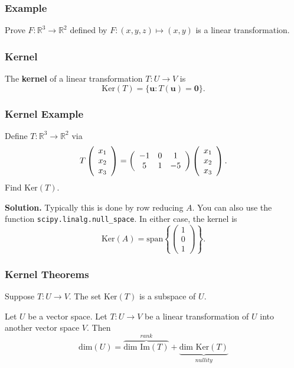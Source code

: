 \documentclass{beamer}
\begin{document}
\begin{frame}[t]
\frametitle{Example}
\begin{Example}
Prove $F: \mathbb{R}^3\to\mathbb{R}^2$ defined by $F:(x, y, z)\mapsto (x, y)$ is a linear transformation.
\end{Example}

\end{frame}

\begin{frame}
\frametitle{Kernel}
\begin{Definition}
The {\bf kernel} of a linear transformation $T:U\to V$ is 
$$
\text{Ker}(T) = \{{\boldsymbol u} : T({\boldsymbol u}) = {\boldsymbol 0}\}.
$$
\end{Definition}
\end{frame}

\begin{frame}
\frametitle{Kernel Example}
\tiny
\begin{Example}
Define $T: \mathbb{R}^3\to \mathbb{R}^2$ via
$$
T\left(\begin{array}{c} x_1\\ x_2\\ x_3\end{array}\right) = \left(\begin{array}{c c c} -1	&	0	&	1\\  5		&	1	&	-5\end{array}\right) \left(\begin{array}{c} x_1\\ x_2\\ x_3\end{array}\right).
$$
Find $\text{Ker}(T)$.
\end{Example}

{\bf Solution.} Typically this is done by row reducing $A$. You can also use the function \texttt{scipy.linalg.null\_space}. In either case, the kernel is
$$
\text{Ker}(A) = \text{span}\left\{\left(\begin{array}{c} 1\\ 0\\ 1\end{array}\right)\right\}.
$$
\end{frame}

\begin{frame}
\frametitle{Kernel Theorems}
\begin{Theorem}
Suppose $T: U\to V$. The set $\text{Ker}(T)$ is a subspace of $U$.
\end{Theorem}

\begin{Theorem}
Let $U$ be a vector space. Let $T: U\to V$ be a linear transformation of $U$ into another vector space $V$. Then
$$
\text{dim}(U) = \overbrace{\text{dim\ Im}(T)}^{rank}+  \underbrace{\text{dim\ Ker}(T)}_{nullity}
$$
\end{Theorem}

\end{frame}
\end{document}
